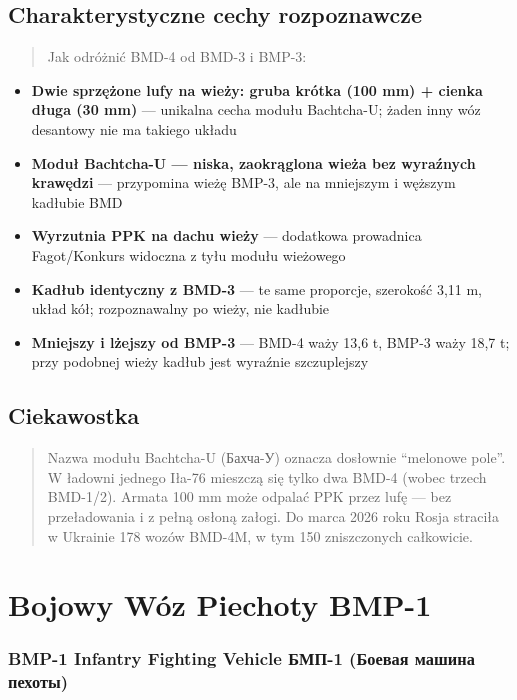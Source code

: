 \documentclass[12pt,oneside]{book}
\providecommand{\tightlist}{%
  \setlength{\itemsep}{0pt}\setlength{\parskip}{0pt}}
\begin{document}
\subsection{Charakterystyczne cechy
rozpoznawcze}\label{charakterystyczne-cechy-rozpoznawcze-10}

\begin{quote}
Jak odróżnić BMD-4 od BMD-3 i BMP-3:
\end{quote}

\begin{itemize}
\tightlist
\item
  \textbf{Dwie sprzężone lufy na wieży: gruba krótka (100 mm) + cienka
  długa (30 mm)} --- unikalna cecha modułu Bachtcha-U; żaden inny wóz
  desantowy nie ma takiego układu
\item
  \textbf{Moduł Bachtcha-U --- niska, zaokrąglona wieża bez wyraźnych
  krawędzi} --- przypomina wieżę BMP-3, ale na mniejszym i węższym
  kadłubie BMD
\item
  \textbf{Wyrzutnia PPK na dachu wieży} --- dodatkowa prowadnica
  Fagot/Konkurs widoczna z tyłu modułu wieżowego
\item
  \textbf{Kadłub identyczny z BMD-3} --- te same proporcje, szerokość
  3,11 m, układ kół; rozpoznawalny po wieży, nie kadłubie
\item
  \textbf{Mniejszy i lżejszy od BMP-3} --- BMD-4 waży 13,6 t, BMP-3 waży
  18,7 t; przy podobnej wieży kadłub jest wyraźnie szczuplejszy
\end{itemize}

\subsection{Ciekawostka}\label{ciekawostka-10}

\begin{quote}
Nazwa modułu Bachtcha-U (Бахча-У) oznacza dosłownie ``melonowe pole''. W
ładowni jednego Iła-76 mieszczą się tylko dwa BMD-4 (wobec trzech
BMD-1/2). Armata 100 mm może odpalać PPK przez lufę --- bez
przeładowania i z pełną osłoną załogi. Do marca 2026 roku Rosja straciła
w Ukrainie 178 wozów BMD-4M, w tym 150 zniszczonych całkowicie.
\end{quote}

\section{Bojowy Wóz Piechoty BMP-1}\label{bojowy-wuxf3z-piechoty-bmp-1}

\subsubsection{BMP-1 Infantry Fighting Vehicle \textbar{} БМП-1 (Боевая
машина
пехоты)}\label{bmp-1-infantry-fighting-vehicle-ux431ux43cux43f-1-ux431ux43eux435ux432ux430ux44f-ux43cux430ux448ux438ux43dux430-ux43fux435ux445ux43eux442ux44b}
\end{document}
